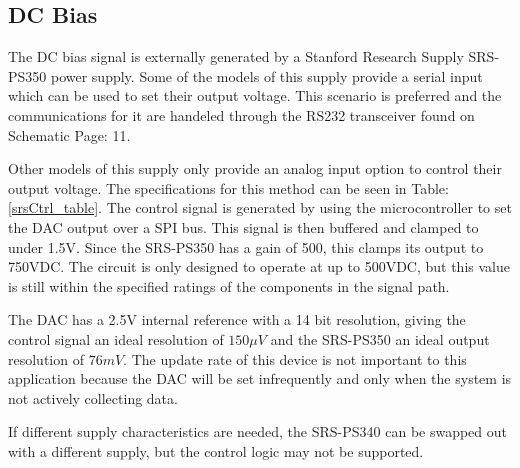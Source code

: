 \subsection {DC Bias}

The DC bias signal is externally generated by a Stanford Research Supply SRS-PS350 power supply. Some of the models of this supply provide a serial input which can be used to set their output voltage. This scenario is preferred and the communications for it are handeled through the RS232 transceiver found on Schematic Page: 11.



Other models of this supply only provide an analog input option to control their output voltage. The specifications for this method can be seen in Table: \ref{srsCtrl_table}. The control signal is generated by using the microcontroller to set the DAC output over a SPI bus. This signal is then buffered and clamped to under 1.5V. Since the SRS-PS350 has a gain of 500, this clamps its output to 750VDC. The circuit is only designed to operate at up to 500VDC, but this value is still within the specified ratings of the components in the signal path.

The DAC has a 2.5V internal reference with a 14 bit resolution, giving the control signal an ideal resolution of $150\mu V$ and the SRS-PS350 an ideal output resolution of $76mV$. The update rate of this device is not important to this application because the DAC will be set infrequently and only when the system is not actively collecting data.

If different supply characteristics are needed, the SRS-PS340 can be swapped out with a different supply, but the control logic may not be supported.

